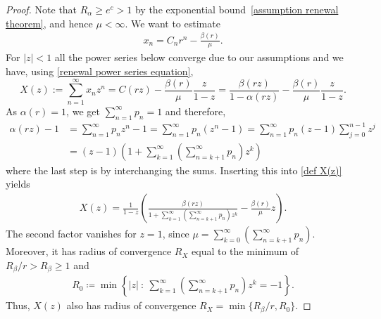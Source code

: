 \documentclass[letterpaper, DIV=17]{scrartcl}
\numberwithin{equation}{section}
\theoremstyle{definition}
\begin{document}
		\begin{proof}
			Note that $R_\alpha \geq  e^{c } > 1   $ by the exponential bound~\eqref{assumption renewal theorem}, and hence  $\mu<\infty$.
			We want to estimate 
			\begin{align*}
				x_n= C_n r^n -\frac{\beta(r)}{\mu}.
			\end{align*}
			For $\vert z \vert<1 $ all the power series below converge due to our assumptions and we have, using \eqref{renewal power series equation},
			\begin{equation} \label{def X(z)}
				X(z) :=\sum_{n=1}^\infty x_n z^n 
				= C(rz) - \frac{\beta(r)}{\mu} \frac{z}{1-z}
				= \frac{\beta(rz)}{1-\alpha(rz)} - \frac{\beta(r)}{\mu} \frac{z}{1-z}.
			\end{equation}
			As $\alpha(r)=1$, we get $\sum_{n=1}^{\infty} p_n =1$ and therefore,
			\begin{align*}
				\alpha(rz) - 1 & = \sum_{n=1}^{\infty} p_n z^n -1 
				= \sum_{n=1}^\infty p_n(z^n -1)
				= \sum_{n=1}^{\infty} p_n (z-1) \sum_{j=0}^{n-1} z^j \\
				& = (z-1) \left(1+\sum_{k=1}^\infty \left(\sum_{n=k+1}^\infty p_n\right) z^k\right)
			\end{align*}
			where the last step is by interchanging the sums. Inserting this into \eqref{def X(z)} yields
			\begin{align*}
				X(z) = \frac{1}{1-z} \left(\frac{\beta(rz)}{1+\sum_{k=1}^{\infty} \left(\sum_{n=k+1}^{\infty} p_n\right) z^k} -\frac{\beta(r)}{\mu} z \right).
			\end{align*}
			The second factor vanishes for $z=1$, since $ \mu =  \sum_{k=0}^{\infty} \left(\sum_{n=k+1}^{\infty} p_n\right)  $. Moreover, it has radius of convergence $R_X$ equal to the minimum of $R_\beta/r >R_\beta \geq 1 $ and
			\begin{align*}
				R_0\coloneqq\min \left\{ |z| \ :  \ \sum_{k=1}^\infty \left(\sum_{n=k+1}^\infty p_n\right) z^k =-1 \right\} .
			\end{align*}
			Thus, $X(z)$ also has radius of convergence $R_X= \min\{R_\beta/r, R_0\}$.
			

\end{proof}
\end{document}
